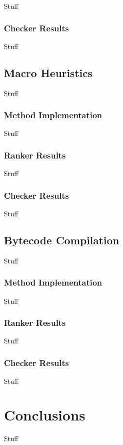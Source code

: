\documentclass[ms,electronic,twosidetoc,letterpaper,chaptercenter,parttop,lol,lof,lot]{byumsphd}
\begin{document}
Stuff

\subsection{Checker Results}

Stuff

\section{Macro Heuristics}

Stuff

\subsection{Method Implementation}

Stuff

\subsection{Ranker Results}

Stuff

\subsection{Checker Results}

Stuff

\section{Bytecode Compilation}

Stuff

\subsection{Method Implementation}

Stuff

\subsection{Ranker Results}

Stuff

\subsection{Checker Results}

Stuff

\chapter{Conclusions}

Stuff

\nocite{testentry}



\end{document}
